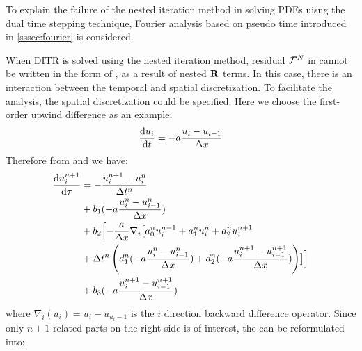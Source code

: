 To explain the failure of the nested iteration method
in solving PDEs uisng the dual time stepping technique, Fourier
analysis based on pseudo time introduced in \ref{sssec:fourier} is considered.

When DITR is solved using the nested iteration method,
residual $\mathcal{F}^N$ in 
cannot be written in the form of  ,
as a result of nested $\mathbf{R}$ terms.
In this case, there is an interaction
between the temporal and spatial discretization.
To facilitate the analysis, the spatial discretization
could be specified.
Here we choose the first-order
upwind difference as an example:
\begin{equation}
    \derivative{u_i}{t} = -a \frac{u_i - u_{i-1}}{\inc x}
    \label{eq:fdup1}
\end{equation}
Therefore from  and  we have:
\begin{equation}
    \begin{aligned}
        \frac{\dd u_i^{n+1}}{\dd \tau} & =
        -\frac{u_i^{n+1} - u_i^{n}}{{\Delta} t^n}      \\
                                       & +
        b_1 (-a\frac{u_i^{n}-u_{i-1}^{n}}{{\Delta} x}) \\
                                       & +
        b_2 \Bigl[-\frac{a}{{\Delta} x} \nabla_i
        \bigl[
        a^n_0u^{n - 1}_i +
        a^n_1u^{n}_i +
        a^n_2u^{n + 1}_i                           \\
                                       & +
        {\Delta} t^n
        \left(
        d^n_1(-a\frac{u_i^{n}-u_{i-1}^{n}}{{\Delta} x}) +
        d^n_2(-a\frac{u_i^{n+1}-u_{i-1}^{n+1}}{{\Delta} x})
        \right)\bigr]  \Bigr]                      \\
                                       & +
        b_3 (-a\frac{u_i^{n+1}-u_{i-1}^{n+1}}{{\Delta} x})
        \label{eq:nestedDITR_F1}
    \end{aligned}
\end{equation}
where $\nabla_i(u_i) = u_i - u_{u_i-1}$ is the $i$ direction
backward difference operator.
Since only $n+1$ related parts on
the right side is of interest,
the  can be reformulated into:

